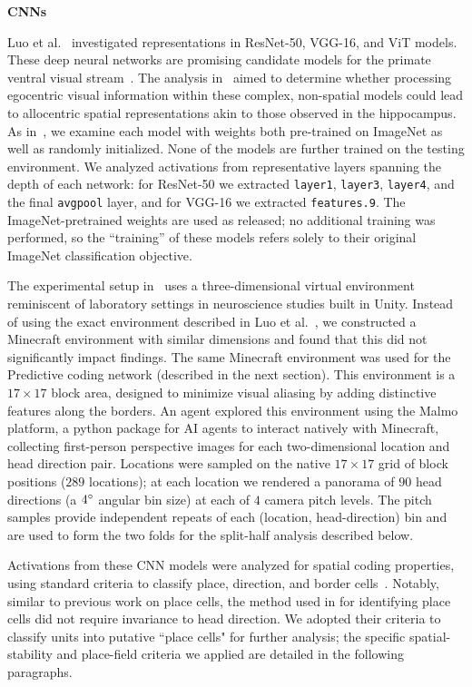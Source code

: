 \documentclass[11pt]{article}
\begin{document}
{\bf CNNs}

Luo et al.~\cite{Luo2024} investigated representations in ResNet-50, VGG-16, and ViT models. These deep neural networks are promising candidate models for the primate ventral visual stream~\cite{Khaligh2014,Yamins2014,Guclu2015,Eickenberg2017,Zeman2020}. The analysis in~\cite{Luo2024} aimed to determine whether processing egocentric visual information within these complex, non-spatial models could lead to allocentric spatial representations akin to those observed in the hippocampus. As in~\cite{Luo2024}, we examine each model with weights both pre-trained on ImageNet as well as randomly initialized. None of the models are further trained on the testing environment. 
We analyzed activations from representative layers spanning the depth of each network: for ResNet-50 we extracted \texttt{layer1}, \texttt{layer3}, \texttt{layer4}, and the final \texttt{avgpool} layer, and for VGG-16 we extracted \texttt{features.9}. The ImageNet-pretrained weights are used as released; no additional training was performed, so the ``training'' of these models refers solely to their original ImageNet classification objective.

The experimental setup in~\cite{Luo2024} uses a three-dimensional virtual environment reminiscent of laboratory settings in neuroscience studies built in Unity. Instead of using the exact environment described in Luo et al.~\cite{Luo2024}, we constructed a Minecraft environment with similar dimensions and found that this did not significantly impact findings. The same Minecraft environment was used for the Predictive coding network (described in the next section).
This environment is a $17\times17$ block area, designed to minimize visual aliasing by adding distinctive features along the borders. An agent explored this environment using the Malmo platform, a python package for AI agents to interact natively with Minecraft, collecting first-person perspective images for each two-dimensional location and head direction pair. Locations were sampled on the native $17\times17$ grid of block positions ($289$ locations); at each location we rendered a panorama of $90$ head directions (a $4\degree$ angular bin size) at each of $4$ camera pitch levels. The pitch samples provide independent repeats of each (location, head-direction) bin and are used to form the two folds for the split-half analysis described below.

Activations from these CNN models were analyzed for spatial coding properties, using standard criteria to classify place, direction, and border cells~\cite{Tanni2022,Banino2018}. Notably, similar to previous work on place cells, the method used in \cite{Luo2024} for identifying place cells did not require invariance to head direction. We adopted their criteria to classify units into putative ``place cells" for further analysis; the specific spatial-stability and place-field criteria we applied are detailed in the following paragraphs.
\end{document}
